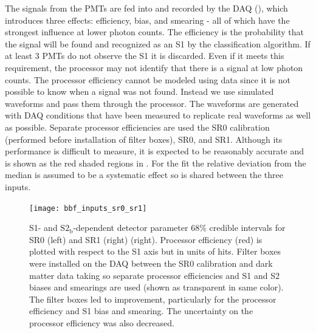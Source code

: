 The signals from the PMTs are fed into and recorded by the DAQ (), which introduces three effects:
efficiency, bias, and smearing - all of which have the strongest influence at lower photon counts.  The efficiency is the probability that
the signal will be found and recognized as an S1 by the
classification algorithm.  If at least 3 PMTs do not observe the S1 it is discarded.  Even if it meets this requirement, the processor
may not identify that there is a signal at low photon counts.  The processor efficiency cannot be modeled using data since it is
not possible to know when a signal was not found.  Instead we use simulated waveforms and pass them through the processor.  The
waveforms are generated with DAQ conditions that have been measured to replicate real waveforms as well as possible.  Separate
processor efficiencies are used the SR0 \ambe calibration (performed before installation of filter boxes), SR0, and SR1.  Although its
performance is difficult to measure, it is expected to be reasonably accurate and is shown as the red shaded regions in
.  For the fit the relative deviation from the median is assumed to be a
systematic effect so is shared between the three inputs.

\begin{figure}
\centering
\texttt{[image: bbf\_inputs\_sr0\_sr1]}
\caption{S1- and $\mathrm{S2_b}$-dependent detector parameter 68\% credible intervals for SR0 (left) and SR1 (right)
(right).  Processor efficiency (red) is plotted with respect to the
S1 axis but in units of hits.  Filter boxes were installed on the DAQ between the SR0 \ambe calibration and
dark matter data taking so separate processor efficiencies and S1 and S2 biases and smearings are used (shown as transparent in same
color).  The filter boxes led to improvement, particularly for the processor efficiency and S1 bias and smearing.  The uncertainty on the
processor efficiency was also decreased.}
\label{fig:er_nr_calibrations_parameter_determ_det_phys_inputs}
\end{figure}

